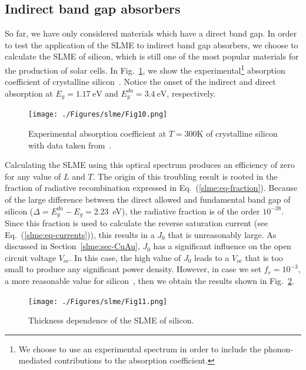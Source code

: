 \begin{refsection}
\subsection{Indirect band gap absorbers} 
 
So far, we have only considered materials which have a direct band gap. In 
order to test the application of the SLME to indirect band gap absorbers, we 
choose to calculate the SLME of silicon, which is still one of the most 
popular materials for the production of solar cells. In 
Fig.~\ref{slme:fig-Si_expAbs}, we show the experimental\footnote{We choose to 
use an experimental spectrum in order to include the phonon-mediated 
contributions to the absorption coefficient.} absorption coefficient of 
crystalline silicon~\cite{green2008}. Notice the onset of the indirect and 
direct absorption at \mbox{$E_g = 1.17~\si{\electronvolt}$} and 
\mbox{$E_g^{da} = 3.4~\si{\electronvolt}$}, respectively. 
 
\begin{figure}[htbp] 
	\centering 
		\texttt{[image: ./Figures/slme/Fig10.png]} 
	\caption{Experimental absorption coefficient at $T = 300\si{\kelvin}$ of 
crystalline silicon with data taken from~\cite{green2008}.} 
	\label{slme:fig-Si_expAbs} 
\end{figure} 
 
Calculating the SLME using this optical spectrum produces an efficiency of 
zero for any value of $L$ and $T$. The origin of this troubling result is 
rooted in the fraction of radiative recombination expressed in 
Eq.~(\ref{slme:eq-fraction}). Because of the large difference between the 
direct allowed and fundamental band gap of silicon ($\Delta = 
E_g^{da}-E_g=2.23$~\si{\electronvolt}), the radiative fraction is of the order 
$10^{-38}$. Since this fraction is used to calculate the reverse saturation 
current (see Eq.~(\ref{slme:eq-currents})), this results in a $J_0$ that is 
unreasonably large. As discussed in Section~\ref{slme:sec-CuAu}, $J_0$ has a 
significant influence on the open circuit voltage $V_{oc}$. In this case, the 
high value of $J_0$ leads to a $V_{oc}$ that is too small to produce any 
significant power density. However, in case we set \mbox{$f_r = 10^{-3}$}, a 
more reasonable value for silicon~\cite{Shockley1952,Trupke2003,Richter2012}, 
then we obtain the results shown in Fig.~\ref{slme:fig-SLME_Si}. 
 
\begin{figure}[htbp] 
	\centering 
		\texttt{[image: ./Figures/slme/Fig11.png]} 
	\caption{Thickness dependence of the SLME of silicon.} 
	\label{slme:fig-SLME_Si} 
\end{figure} 
 

\end{refsection}
